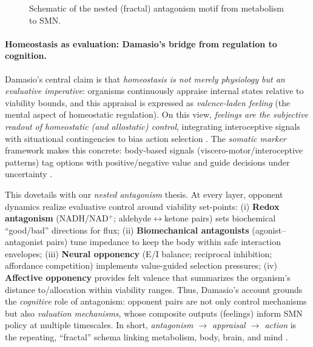 \begin{figure}[t]
  \centering
   \caption{Schematic of the nested (fractal) antagonism motif from metabolism to SMN.}
   \label{fig:nested_antagonism}
\end{figure}


\paragraph{Homeostasis as evaluation: Damasio's bridge from regulation to cognition.}
Damasio’s central claim is that \emph{homeostasis is not merely physiology but an evaluative imperative}: organisms continuously appraise internal states relative to viability bounds, and this appraisal is expressed as \emph{valence-laden feeling} (the mental aspect of homeostatic regulation). On this view, \emph{feelings are the subjective readout of homeostatic (and allostatic) control}, integrating interoceptive signals with situational contingencies to bias action selection \citep{Damasio1994_DescartesError,Damasio1999_Feeling,Damasio2010_Self,Damasio2018_StrangeOrder}. The \emph{somatic marker} framework makes this concrete: body-based signals (viscero-motor/interoceptive patterns) tag options with positive/negative value and guide decisions under uncertainty \citep{Damasio1994_DescartesError,Bechara1997_SomaticMarkers}. 

This dovetails with our \emph{nested antagonism} thesis. At every layer, opponent dynamics realize evaluative control around viability set-points: 
(i) \textbf{Redox antagonism} (NADH/NAD$^+$; aldehyde$\leftrightarrow$ketone pairs) sets biochemical ``good/bad'' directions for flux; 
(ii) \textbf{Biomechanical antagonists} (agonist--antagonist pairs) tune impedance to keep the body within safe interaction envelopes; 
(iii) \textbf{Neural opponency} (E/I balance; reciprocal inhibition; affordance competition) implements value-guided selection pressures; 
(iv) \textbf{Affective opponency} provides felt valence that summarizes the organism’s distance to/allocation within viability ranges. 
Thus, Damasio’s account grounds the \emph{cognitive} role of antagonism: opponent pairs are not only control mechanisms but also \emph{valuation mechanisms}, whose composite outputs (feelings) inform SMN policy at multiple timescales. In short, \emph{antagonism $\to$ appraisal $\to$ action} is the repeating, ``fractal'' schema linking metabolism, body, brain, and mind \citep{Damasio2018_StrangeOrder,Damasio2021_FeelingKnowing}.

